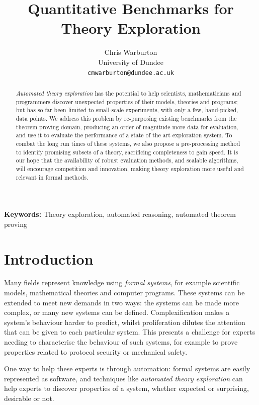 \documentclass[]{default}
\title{Quantitative Benchmarks for Theory Exploration}
\author{Chris Warburton \\
          University of Dundee \\
          \texttt{cmwarburton@dundee.ac.uk}}
\date{}
\begin{document}
\maketitle
\begin{abstract}
  \emph{Automated theory exploration} has the potential to help scientists,
  mathematicians and programmers discover unexpected properties of their models,
  theories and programs; but has so far been limited to small-scale experiments,
  with only a few, hand-picked, data points. We address this problem by
  re-purposing existing benchmarks from the theorem proving domain, producing an
  order of magnitude more data for evaluation, and use it to evaluate the
  performance of a state of the art exploration system. To combat the long run
  times of these systems, we also propose a pre-processing method to identify
  promising subsets of a theory, sacrificing completeness to gain speed. It is
  our hope that the availability of robust evaluation methods, and scalable
  algorithms, will encourage competition and innovation, making theory
  exploration more useful and relevant in formal methods.
\end{abstract}


\textbf{Keywords:} Theory exploration, automated reasoning, automated theorem
proving


\section{Introduction}\label{introduction}

Many fields represent knowledge using \emph{formal systems}, for example
scientific models, mathematical theories and computer programs. These systems
can be extended to meet new demands in two ways: the systems can be made more
complex, or many new systems can be defined. Complexification makes a system's
behaviour harder to predict, whilst proliferation dilutes the attention that can
be given to each particular system. This presents a challenge for experts
needing to characterise the behaviour of such systems, for example to prove
properties related to protocol security or mechanical safety.

One way to help these experts is through automation: formal systems are easily
represented as software, and techniques like \emph{automated theory exploration}
can help experts to discover properties of a system, whether expected or
surprising, desirable or not.
\end{document}

